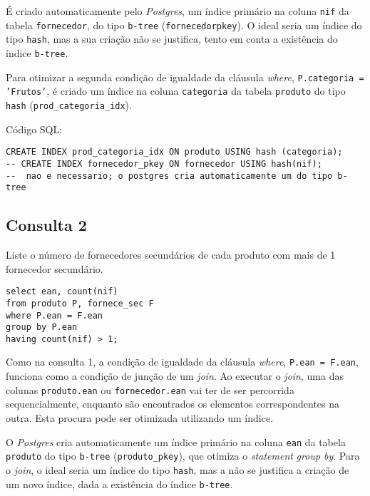 \documentclass[12pt]{extarticle}
\begin{document}
É criado automaticamente pelo \textit{Postgres}, um índice primário na coluna \texttt{nif} da tabela\linebreak
\texttt{fornecedor}, do tipo \texttt{b-tree} (\texttt{fornecedor\textunderscore pkey}). O ideal seria um índice do tipo \texttt{hash}, mas a sua criação não se justifica, tento em conta a existência do índice \texttt{b-tree}.\par

\smallskip
Para otimizar a segunda condição de igualdade da cláusula \textit{where}, \texttt{P.categoria = 'Frutos'}, é criado um índice na coluna \texttt{categoria} da tabela \texttt{produto} do tipo \texttt{hash}\linebreak
(\texttt{prod\_categoria\_idx}).\par

\bigskip

\noindent Código SQL:\par

\begin{lstlisting}
CREATE INDEX prod_categoria_idx ON produto USING hash (categoria);
-- CREATE INDEX fornecedor_pkey ON fornecedor USING hash(nif);
--  nao e necessario; o postgres cria automaticamente um do tipo b-tree
\end{lstlisting}

\subsection{Consulta 2}
Liste o número de fornecedores secundários de cada produto com mais de 1 fornecedor secundário.

\begin{lstlisting}
select ean, count(nif)
from produto P, fornece_sec F
where P.ean = F.ean
group by P.ean
having count(nif) > 1;
\end{lstlisting}
\medskip

Como na consulta 1, a condição de igualdade da cláusula \textit{where}, \texttt{P.ean = F.ean}, funciona como a condição de junção de um \textit{join}. Ao executar o \textit{join}, uma das colunas \texttt{produto.ean} ou \texttt{fornecedor.ean} vai ter de ser percorrida sequencialmente, enquanto são encontrados os elementos correspondentes na outra. Esta procura pode ser otimizada utilizando um índice.\par

O \textit{Postgres} cria automaticamente um índice primário na coluna \texttt{ean} da tabela \texttt{produto} do tipo \texttt{b-tree} (\texttt{produto\_pkey}), que otimiza o \textit{statement} \textit{group by}. Para o \textit{join}, o ideal seria um índice do tipo \texttt{hash}, mas a não se justifica a criação de um novo índice, dada a existência do índice \texttt{b-tree}.\par
\end{document}
